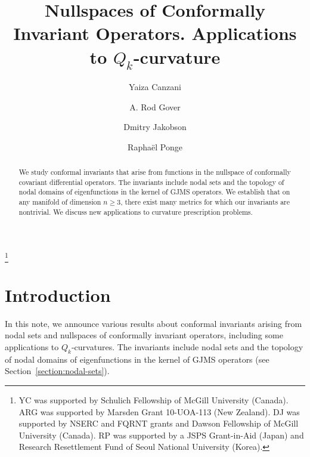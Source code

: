 \documentclass{amsart}
\theoremstyle{definition}
\theoremstyle{remark}
\begin{document}
\title[Conformal invariants from nullspaces]{Nullspaces of Conformally Invariant Operators. Applications to $Q_{k}$-curvature}

\author[Y. Canzani]{Yaiza Canzani}
\address{Department of Mathematics and Statistics, McGill University, Montr\'eal,
Ca\-na\-da.} 

\author[A.R. Gover]{A. Rod Gover}
\address{Department of Mathematics, University of Auckland, New Zealand \&
Mathematical Sciences Institute, Australian National University, Canberra, Australia.}

\author[D. Jakobson]{Dmitry Jakobson}
\address{Department of Mathematics and
Statistics, McGill University, Montr\'eal, Ca\-na\-da.}

\author[R. Ponge]{Rapha\"el Ponge}
\address{Department of Mathematical Sciences, Seoul National University, Seoul, Korea.} 



\thanks{YC was supported by Schulich Fellowship of McGill University (Canada). 
ARG was supported by Marsden Grant 10-UOA-113 (New Zealand). DJ was
  supported by NSERC and FQRNT grants and Dawson Fellowship of McGill University (Canada).  RP was supported by a JSPS Grant-in-Aid (Japan) and Research Resettlement Fund of Seoul National University (Korea).}  

\begin{abstract}
We study conformal invariants that arise from functions in the
nullspace of conformally covariant differential operators.
The invariants include nodal sets and the topology of nodal domains
of eigenfunctions in the kernel of GJMS operators. We establish 
that on any manifold of dimension $n\geq 3$, there exist many metrics 
for which our invariants are nontrivial.  We discuss new applications 
to curvature prescription problems.  
\end{abstract}

\maketitle

\section* {Introduction} 
In this note, we announce various results about conformal invariants arising from nodal sets and nullspaces of conformally invariant operators, including some
applications to $Q_{k}$-curvatures. The invariants include nodal sets and the topology of nodal domains
of eigenfunctions in the kernel of GJMS operators (see Section~\ref{section:nodal-sets}). 
\end{document}
